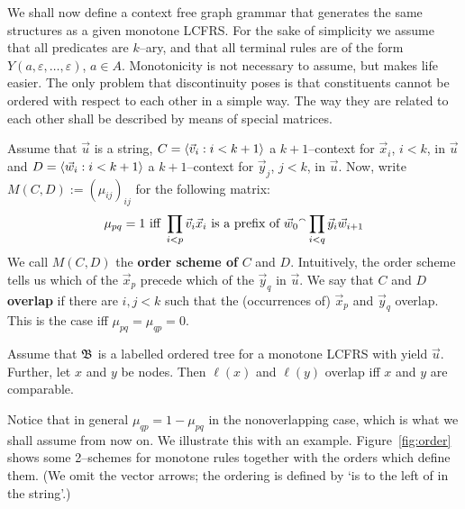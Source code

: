 We shall now define a context free graph grammar that generates the 
same structures as a given monotone LCFRS. For the sake of 
simplicity we assume that all predicates are $k$--ary, and that all 
terminal rules are of the form $Y(a, \varepsilon, \dotsc, \varepsilon)$, 
$a \in A$. Monotonicity is not necessary to assume, but makes life 
easier. The only problem 
that discontinuity poses is that constituents cannot be ordered 
with respect to each other in a simple way. The way they are related 
to each other shall be described by means of special matrices.  

Assume that $\vec{u}$ is a string, $C = \langle \vec{v}_i : i < k+1\rangle$ 
a $k+1$--context for $\vec{x}_i$, $i < k$, in $\vec{u}$ and 
$D = \langle \vec{w}_i : i < k+1\rangle$ a $k+1$--context for $\vec{y}_j$, 
$j < k$, in $\vec{u}$. Now, write $M(C,D) := (\mu_{ij})_{ij}$ for the 
following matrix: 
\begin{equation}
\mu_{pq} = 1 \text{ iff } \prod_{i < p} \vec{v}_i\vec{x}_i 
\text{ is a prefix of } \vec{w}_0{^{\smallfrown}} \prod_{i < q} \vec{y}_i\vec{w}_{i+1} 
\end{equation}
We call $M(C,D)$ the \textbf{order scheme of} $C$ and $D$. 
Intuitively, the order scheme tells us which of the $\vec{x}_p$ 
precede which of the $\vec{y}_q$ in $\vec{u}$.  We say that $C$ and 
$D$ \textbf{overlap} if there are $i, j < k$ such that the (occurrences 
of) $\vec{x}_p$ and $\vec{y}_q$ overlap. This is the case iff 
$\mu_{pq} = \mu_{qp} = 0$.
\begin{lem}
Assume that $\mathfrak{B}$ is a labelled ordered tree for a monotone LCFRS 
with yield $\vec{u}$. Further, let $x$ and $y$ be nodes. Then $\ell(x)$ 
and $\ell(y)$ overlap iff $x$ and $y$ are comparable. 
\end{lem}
Notice that in general $\mu_{qp} = 1 - \mu_{pq}$ in the nonoverlapping 
case, which is what we shall assume from now on. We illustrate this with 
an example. Figure~\ref{fig:order} shows some 2--schemes for monotone 
rules together with the orders which define them. (We omit the vector 
arrows; the ordering is defined by `is to the left of in the string'.) 
